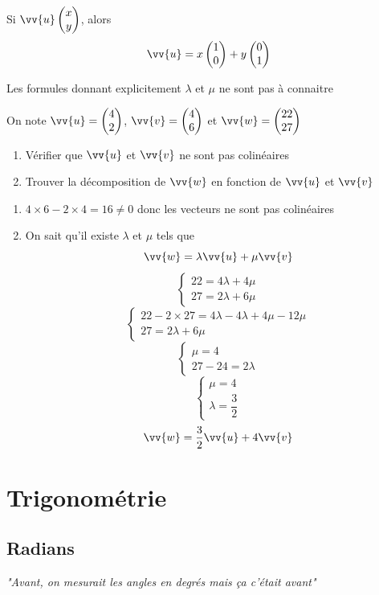 Si $\vv{u} \covec{x}{y}$, alors 
$$\vv{u} = x \covec{1}{0} + y \covec{0}{1}$$
\begin{remarque}
Les formules donnant explicitement $\lambda$ et $\mu$ ne sont pas à connaitre
\end{remarque}
\begin{exemple}
On note $\vv{u} = \covec{4}{2}$, $\vv{v} = \covec{4}{6}$ et $\vv{w} = \covec{22}{27}$
\begin{enumerate}
\item Vérifier que $\vv{u}$ et $\vv{v}$ ne sont pas colinéaires
\item Trouver la décomposition de $\vv{w}$ en fonction de $\vv{u}$ et $\vv{v}$
\end{enumerate}
\begin{enumerate}
\item $4\times 6 -2\times 4 = 16 \neq 0$ donc les vecteurs ne sont pas colinéaires
\item On sait qu'il existe $\lambda$ et $\mu$ tels que 
$$\vv{w} = \lambda \vv{u} + \mu \vv{v}$$
$$\left\{ \begin{array}{l} 22 = 4\lambda  + 4\mu \\ 27 = 2\lambda + 6\mu \end{array} \right.$$
$$\left\{ \begin{array}{l} 22 - 2\times 27 = 4\lambda - 4\lambda + 4\mu - 12\mu \\ 27 = 2\lambda + 6\mu \end{array} \right.$$
$$\left\{ \begin{array}{l} \mu = 4 \\ 27 -24 = 2\lambda \end{array} \right.$$
$$\left\{ \begin{array}{l} \mu = 4 \\ \lambda = \dfrac{3}{2} \end{array} \right.$$
$$\vv{w} = \dfrac{3}{2} \vv{u} + 4 \vv{v}$$
\end{enumerate}
\end{exemple}
\chapter{Trigonométrie}
\label{chap:trigo}
\section{Radians}
\emph{"Avant, on mesurait les angles en degrés mais ça c'était avant"}\newline


